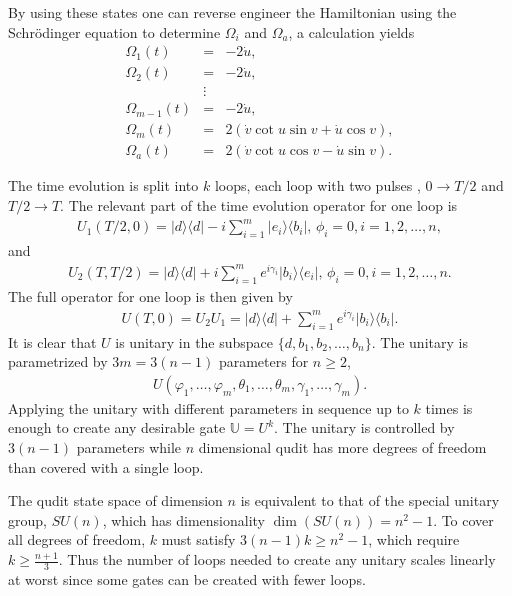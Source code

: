 \documentclass[pra,showpacs,priprent,twocolumn,superscriptaddress]{revtex4-1}
\newcommand{\ket}[1]{|#1\rangle}
\newcommand{\bra}[1]{\langle #1|}
\begin{document}
By using these states one can reverse engineer the Hamiltonian using the Schr{\"o}dinger equation to determine $\Omega_i$ and $\Omega_a$,
a calculation yields
\begin{eqnarray}
\Omega_1(t) &=& -2\dot{u},
\nonumber\\ 
\Omega_2(t) &=& -2\dot{u},
\nonumber\\
&\vdots &
\nonumber\\
\Omega_{m-1}(t) &=& -2\dot{u},
\nonumber\\
\Omega_m(t) &=& 2\left(\dot{v}\cot u\sin v + \dot{u}\cos v \right),
\nonumber\\
\Omega_a(t) &=& 2\left(\dot{v}\cot u\cos v - \dot{u}\sin v \right).
\end{eqnarray}

The time evolution is split into $k$ loops, each loop with two pulses \cite{herterich16}, $0 \longrightarrow T/2$ and $T/2 \longrightarrow T$. The relevant part of the time evolution operator for one loop is  
\begin{eqnarray}
U_1(T/2,0) = \ket{d}\bra{d} -i\sum_{i = 1}^m \ket{e_i}\bra{b_i},\, \phi_i = 0, i = 1,2,\dots,n,
\end{eqnarray} and 
\begin{eqnarray}
U_2(T,T/2) = \ket{d}\bra{d} + i\sum_{i = 1}^m e^{i\gamma_i}\ket{b_i}\bra{e_i},\, \phi_i = 0, i = 1,2,\dots,n.
\end{eqnarray}
The full operator for one loop is then given by 
\begin{eqnarray}
U(T,0) = U_2U_1 = \ket{d}\bra{d} + \sum_{i = 1}^{m}e^{i\gamma_i}\ket{b_i}\bra{b_i}.
\end{eqnarray}
It is clear that $U$ is unitary in the subspace $\{d,b_1,b_2,\dots, b_n\}.$ The unitary is parametrized by $3m = 3(n-1)$ parameters for $ n\geq 2$,
\begin{eqnarray}
U(\varphi_1,\dots,\varphi_m,\theta_1,\dots,\theta_m,\gamma_1,\dots,\gamma_m).
\end{eqnarray} 
Applying the unitary with different parameters in sequence up to $k$ times is enough to create any desirable gate $\mathbb{U} = U^k$. The unitary is controlled by $3(n-1)$ parameters while $n$ dimensional qudit has more degrees of freedom than covered with a single loop.

The qudit state space of dimension $n$ is equivalent to that of the special unitary group, $SU(n)$, which has dimensionality $\dim(SU(n)) = n^2 -1$. To cover all degrees of freedom, $k$ must satisfy $3(n-1)k \geq n^2 -1$, which require $k \geq \frac{n+1}{3}$. Thus the number of loops needed to create any unitary scales linearly at worst since some gates can be created with fewer loops. 
\end{document}
